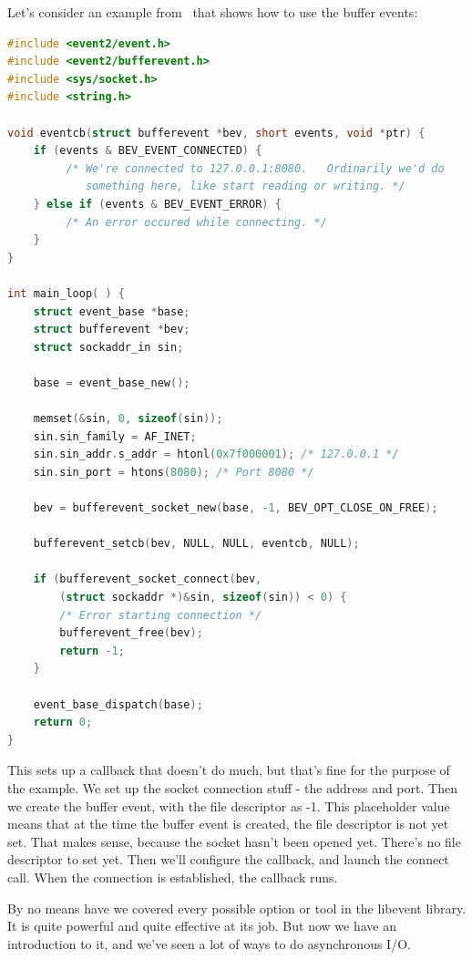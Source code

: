 \documentclass[a4paper]{report}
\begin{document}
Let's consider an example from~\cite{libevent} that shows how to use the buffer events:
\begin{lstlisting}[language=C]
#include <event2/event.h>
#include <event2/bufferevent.h>
#include <sys/socket.h>
#include <string.h>

void eventcb(struct bufferevent *bev, short events, void *ptr) {
    if (events & BEV_EVENT_CONNECTED) {
         /* We're connected to 127.0.0.1:8080.   Ordinarily we'd do
            something here, like start reading or writing. */
    } else if (events & BEV_EVENT_ERROR) {
         /* An error occured while connecting. */
    }
}

int main_loop( ) {
    struct event_base *base;
    struct bufferevent *bev;
    struct sockaddr_in sin;

    base = event_base_new();

    memset(&sin, 0, sizeof(sin));
    sin.sin_family = AF_INET;
    sin.sin_addr.s_addr = htonl(0x7f000001); /* 127.0.0.1 */
    sin.sin_port = htons(8080); /* Port 8080 */

    bev = bufferevent_socket_new(base, -1, BEV_OPT_CLOSE_ON_FREE);

    bufferevent_setcb(bev, NULL, NULL, eventcb, NULL);

    if (bufferevent_socket_connect(bev,
        (struct sockaddr *)&sin, sizeof(sin)) < 0) {
        /* Error starting connection */
        bufferevent_free(bev);
        return -1;
    }

    event_base_dispatch(base);
    return 0;
}
\end{lstlisting}

This sets up a callback that doesn't do much, but that's fine for the purpose of the example. We set up the socket connection stuff - the address and port. Then we create the buffer event, with the file descriptor as -1. This placeholder value means that at the time the buffer event is created, the file descriptor is not yet set. That makes sense, because the socket hasn't been opened yet. There's no file descriptor to set yet. Then we'll configure the callback, and launch the connect call. When the connection is established, the callback runs.

By no means have we covered every possible option or tool in the libevent library. It is quite powerful and quite effective at its job. But now we have an introduction to it, and we've seen a lot of ways to do asynchronous I/O.
\end{document}
